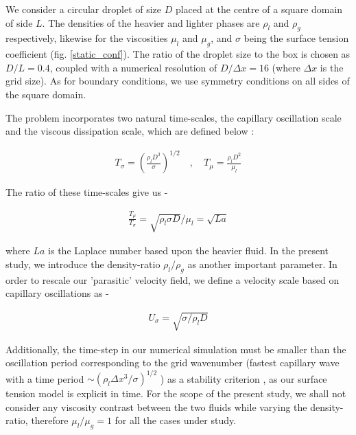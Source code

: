 We consider a circular droplet of size $D$  placed at the centre of a square domain of side $L$. The densities of the heavier and lighter phases are $\rho_l$ and $\rho_g$ respectively, likewise for the viscosities $\mu_l$ and $\mu_g$, and $\sigma$ being the surface tension coefficient (fig. \ref{static_conf}). The ratio of the droplet size to the box is chosen as $D/L = 0.4$, coupled with a numerical resolution of $D/\Delta x= 16$ (where $\Delta x$ is the grid size). As for boundary conditions, we use symmetry conditions on all sides of the square domain.

The problem incorporates two natural time-scales, the capillary oscillation scale and the viscous dissipation scale, which are defined below :

\begin{align}
        T_\sigma = \left(\frac{\rho_l D^3}{\sigma}\right)^{1/2} \quad , \quad T_\mu = \frac{\rho_l D^2}{\mu_l}
\label{ts}
\end{align}

The ratio of these time-scales give us -

\begin{align}
        \frac{T_\mu}{T_\sigma} = \sqrt{\rho_l \sigma D}/\mu_l = \sqrt{La}
\end{align}

where $La$ is the Laplace number based upon the heavier fluid. In the present study, we introduce the density-ratio $\rho_l/\rho_g$ as another important parameter. In order to rescale our 'parasitic' velocity field, we define a velocity scale based on capillary oscillations as -

\begin{align}
        U_\sigma = \sqrt{\sigma/\rho_l D}
\end{align}

Additionally, the time-step in our numerical simulation must be smaller than the oscillation period corresponding to the grid wavenumber (fastest capillary wave with a time period $\sim \left( \rho_l \Delta x^3 / \sigma  \right)^{1/2} $ ) as a stability criterion , as our surface tension model is explicit in time. For the scope of the present study, we shall not consider any viscosity contrast between the two fluids while varying the density-ratio, therefore $\mu_l/\mu_g = 1$ for all the cases under study.



